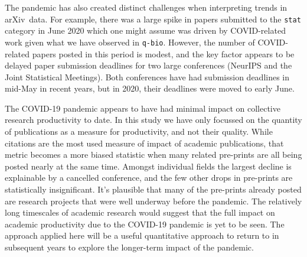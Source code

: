 \documentclass[a4paper,12pt]{article}
\newcommand{\arxiv}{arXiv}
\begin{document}






The pandemic has also created distinct challenges when interpreting trends in \arxiv\ data. For example, there was a large spike in papers submitted to the \texttt{stat} category in June 2020 which one might assume was driven by COVID-related work given what we have observed in \texttt{q-bio}. However, the number of COVID-related papers posted in this period is modest, and the key factor appears to be delayed paper submission deadlines for two large conferences (NeurIPS and the Joint Statistical Meetings). Both conferences have had submission deadlines in mid-May in recent years, but in 2020, their deadlines were moved to early June.





The COVID-19 pandemic appears to have had minimal impact on collective research productivity to date. In this study we have only focussed on the quantity of publications as a measure for productivity, and not their quality. While citations are the most used measure of impact of academic publications, that metric becomes a more biased statistic when many related pre-prints are all being posted nearly at the same time\cite{Fassin:2021}. Amongst individual fields the largest decline is explainable by a cancelled conference, and the few other drops in pre-prints are statistically insignificant. It's plausible that many of the pre-prints already posted are research projects that were well underway before the pandemic. The relatively long timescales of academic research would suggest that the full impact on academic productivity due to the COVID-19 pandemic is yet to be seen. The approach applied here will be a useful quantitative approach to return to in subsequent years to explore the longer-term impact of the pandemic.
\end{document}
